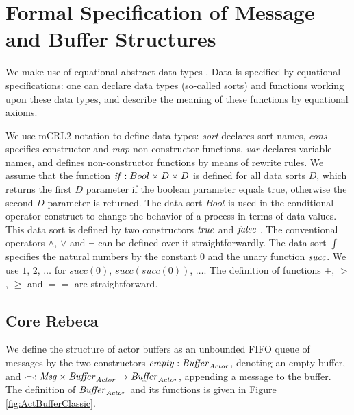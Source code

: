 \appendix
\section{Formal Specification of Message and Buffer Structures\label{sec::data}}
We make use of equational abstract data types \cite{ADT}. Data is specified
by equational specifications: one can declare data types (so-called sorts) and functions working upon these data types, and
describe the meaning of these functions by equational axioms. 

We use {mCRL2} \cite{Groote} notation to define data types: \emph{sort} declares sort names, \emph{cons} specifies constructor and \emph{map} non-constructor functions, \emph{var} declares variable names, and  defines non-constructor functions by means of rewrite rules. We assume that the function ${\it if} : Bool \times D \times D$ is defined for all data sorts $D$, which returns the first $D$ parameter if the
boolean parameter equals true, otherwise the second $D$ parameter is returned.
The data sort $Bool$ is used in the conditional operator construct to change the behavior of a process in terms of data
values. This data sort is defined by two constructors $\it true$ and $\it false$ . The conventional operators $\wedge$, $\vee$ and $\neg$ can be defined over it straightforwardly. The data sort $\int$ specifies the natural numbers by the constant $0$ and the unary function $\it succ$. We use $1$, $2$, $\ldots$ for $succ(0)$, $succ(succ(0))$, $\ldots$. The definition of functions $+$, $>$, $\ge$ and $==$ are straightforward.

\subsection{Core Rebeca\label{sec::dataCore}}
We define the structure of actor buffers as an unbounded FIFO queue of messages by the two constructors $\mathit{empty}: \mathit{Buffer}_{\it Actor}$, denoting an empty buffer, and $\frown: \mathit{Msg} \times \mathit{Buffer}_{\it Actor}  \rightarrow \mathit{Buffer}_{\it Actor}$, appending a message to the buffer. The definition of $\mathit{Buffer}_{\it Actor}$ and its functions is given in Figure \ref{fig:ActBufferClassic}.

